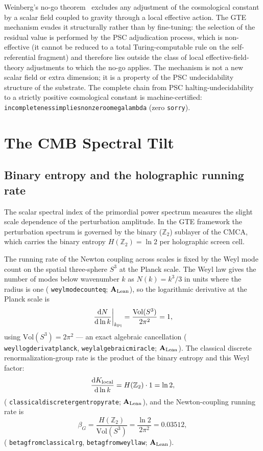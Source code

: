 \documentclass[11pt]{article}
\theoremstyle{remark}
\newcommand{\ZT}{\mathbb{Z}_2}
\newcommand{\lean}[1]{%
  \penalty-100
  \begingroup\def\_{\textunderscore\allowbreak}\texttt{#1}\endgroup}
\newcommand{\betaG}{\beta_G}
\newcommand{\CMCA}{\text{CMCA}}
\newcommand{\CatAL}{\ensuremath{\textbf{A}_{\rm Lean}}}
\begin{document}
Weinberg's no-go theorem~\cite{Weinberg1989} excludes any adjustment of the
cosmological constant by a scalar field coupled to gravity through a local
effective action. The GTE mechanism evades it structurally rather than by
fine-tuning: the selection of the residual value is performed by the PSC
adjudication process, which is non-effective (it cannot be reduced to a total
Turing-computable rule on the self-referential fragment) and therefore lies outside
the class of local effective-field-theory adjustments to which the no-go applies.
The mechanism is not a new scalar field or extra dimension; it is a property of the
PSC undecidability structure of the substrate.
The complete chain from PSC halting-undecidability to a strictly positive cosmological
constant is machine-certified: \lean{incompleteness\_implies\_nonzero\_omega\_lambda}
(zero \texttt{sorry}).

\section{The CMB Spectral Tilt}
\label{sec:cmb}

\subsection{Binary entropy and the holographic running rate}

The scalar spectral index of the primordial power spectrum measures the slight
scale dependence of the perturbation amplitude. In the GTE framework the
perturbation spectrum is governed by the binary ($\ZT$) sublayer of the $\CMCA$,
which carries the binary entropy $H(\ZT) = \ln 2$ per holographic screen cell.

The running rate of the Newton coupling across scales is fixed by the Weyl mode
count on the spatial three-sphere $S^3$ at the Planck scale. The Weyl law gives the
number of modes below wavenumber $k$ as $N(k) = k^3/3$ in units where the radius is
one (\lean{weyl\_mode\_count\_eq}; \CatAL), so the logarithmic derivative at the
Planck scale is
\begin{equation}
  \left.\frac{\mathrm{d}N}{\mathrm{d}\ln k}\right|_{k_{\rm Pl}}
  = \frac{\mathrm{Vol}(S^3)}{2\pi^2} = 1,
\end{equation}
using $\mathrm{Vol}(S^3) = 2\pi^2$ --- an exact algebraic cancellation
(\lean{weyl\_log\_deriv\_at\_planck}, \lean{weyl\_algebraic\_miracle}; \CatAL). The
classical discrete renormalization-group rate is the product of the binary entropy
and this Weyl factor:
\begin{equation}
  \frac{\mathrm{d}K_{\rm local}}{\mathrm{d}\ln k} = H(\ZT)\cdot 1 = \ln 2,
\end{equation}
(\lean{classical\_discrete\_rg\_entropy\_rate}; \CatAL), and the Newton-coupling
running rate is
\begin{equation}
  \betaG = \frac{H(\ZT)}{\mathrm{Vol}(S^3)} = \frac{\ln 2}{2\pi^2} = 0.03512,
  \label{eq:betag}
\end{equation}
(\lean{beta\_g\_from\_classical\_rg}, \lean{beta\_g\_from\_weyl\_law}; \CatAL).
\end{document}
